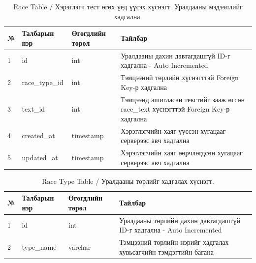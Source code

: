\begin{table}[h]
	\caption{Race Table / Хэрэглэгч тест өгөх үед үүсэх хүснэгт. Уралдааны мэдээллийг хадгална.}
	\begin{tabular}{|l|l|l|p{8cm}|}
		\hline
		№ & Талбарын нэр   & Өгөгдлийн төрөл & Тайлбар                                                                             \\ \hline
		1 & id             & int             & Уралдааны дахин давтагдашгүй ID-г хадгална - Auto Incremented                       \\ \hline
		2 & race\_type\_id & int             & Тэмцээний төрлийн хүснэгттэй Foreign Key-р хадгална                                 \\ \hline
		3 & text\_id       & int             & Тэмцээнд ашигласан текстийг зааж өгсөн race\_text хүснэгттэй Foreign Key-р хадгална \\ \hline
		4 & created\_at    & timestamp       & Хэрэглэгчийн хаяг үүссэн хугацааг серверээс авч хадгална                            \\ \hline
		5 & updated\_at    & timestamp       & Хэрэглэгчийн хаяг өөрчлөгдсөн хугацааг серверээс авч хадгална                       \\ \hline
	\end{tabular}
\end{table}


\begin{table}[h]
	\caption{Race Type Table / Уралдааны төрлийг хадгалах хүснэгт.}
	\begin{tabular}{|l|l|l|p{8cm}|}
		\hline
		№ & Талбарын нэр & Өгөгдлийн төрөл & Тайлбар                                                               \\ \hline
		1 & id           & int             & Уралдааны төрлийн дахин давтагдашгүй ID-г хадгална - Auto Incremented \\ \hline
		2 & type\_name   & varchar         & Тэмцээний төрлийн нэрийг хадгалах хувьсагчийн тэмдэгтийн багана       \\ \hline
	\end{tabular}
\end{table}


